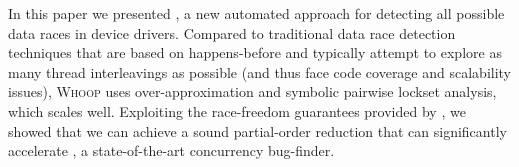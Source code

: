 In this paper we presented \whoop, a new automated approach for detecting all possible data races in device drivers. Compared to traditional data race detection techniques that are based on happens-before and typically attempt to explore as many thread interleavings as possible (and thus face code coverage and scalability issues), \textsc{Whoop} uses over-approximation and symbolic pairwise lockset analysis, which scales well. Exploiting the race-freedom guarantees provided by \whoop, we showed that we can achieve a sound partial-order reduction that can significantly accelerate \corral, a state-of-the-art concurrency bug-finder.
